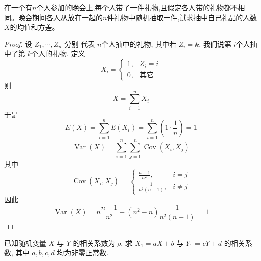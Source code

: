 \documentclass[../main.tex]{subfiles}
\begin{document}
\begin{exercise}{}{}
在一个有\(n\)个人参加的晚会上,每个人带了一件礼物,且假定各人带的礼物都不相同。晚会期间各人从放在一起的\(n\)件礼物中随机抽取一件,试求抽中自己礼品的人数\(X\)的均值和方差。
\end{exercise}

\begin{proof}
    设 \(  Z_1,\cdots ,Z_{n}  \) 分别 代表 \(  n  \)个人抽中的礼物, 其中若 \(  Z_{i}= k  \), 我们说第 \(  i  \)个人抽中了第 \(  k  \)个人的礼物. 定义 \[
    X_{i}= \begin{cases} 1,& Z_{i}= i\\ 
     0,& \text{其它} \end{cases} 
    \]    则 \[
    X= \sum _{i= 1}^{n}X_{i}
    \]于是 \[
    E\left( X \right)= \sum _{i= 1}^{n}E\left( X_{i} \right)= \sum _{i= 1}^{n}\left( 1\cdot \frac{1}{n} \right)= 1   
    \] \[
    \operatorname{Var}\left( X \right)= \sum _{i= 1}^{n}\sum _{j= 1}^{n}\operatorname{Cov}\left( X_{i},X_{j} \right)  
    \]其中 \[
    \operatorname{Cov}\left( X_{i},X_{j} \right)= \begin{cases} \frac{n-1}{n^{2}}, & i= j\\ 
  \frac{1 }{n^{2}\left( n-1 \right)  } ,& i\neq j   \end{cases}  
    \]因此 \[
    \operatorname{Var}\left( X \right)= n \frac{n-1 }{n^{2} }+  \left( n^{2}-n \right)\frac{1 }{n^{2}\left( n-1 \right)  }= 1     
    \]
\end{proof}
\begin{exercise}{}{}
已知随机变量 $X$ 与 $Y$ 的相关系数为 $\rho$, 求 $X_{1}=aX+b$ 与 $Y_{1}=cY+d$ 的相关系数, 其中 $a,b,c,d$ 均为非零正常数.
\end{exercise}
\end{document}
